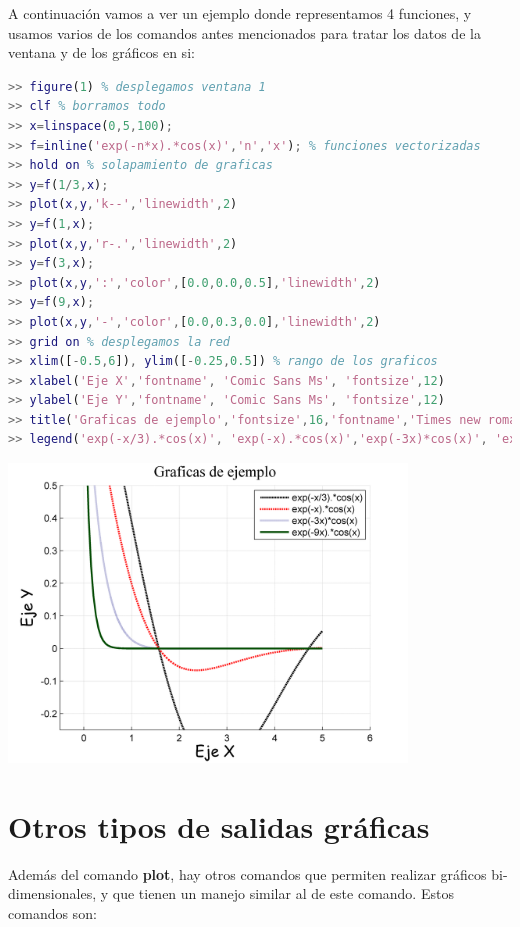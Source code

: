 A continuación vamos a ver un ejemplo donde representamos 4 funciones, y usamos varios de los comandos antes mencionados para tratar los datos de la ventana y de los gráficos en si:

\begin{lstlisting}[language=Matlab]
>> figure(1) % desplegamos ventana 1
>> clf % borramos todo
>> x=linspace(0,5,100);
>> f=inline('exp(-n*x).*cos(x)','n','x'); % funciones vectorizadas
>> hold on % solapamiento de graficas
>> y=f(1/3,x);
>> plot(x,y,'k--','linewidth',2)
>> y=f(1,x);
>> plot(x,y,'r-.','linewidth',2)
>> y=f(3,x);
>> plot(x,y,':','color',[0.0,0.0,0.5],'linewidth',2)
>> y=f(9,x);
>> plot(x,y,'-','color',[0.0,0.3,0.0],'linewidth',2)
>> grid on % desplegamos la red
>> xlim([-0.5,6]), ylim([-0.25,0.5]) % rango de los graficos
>> xlabel('Eje X','fontname', 'Comic Sans Ms', 'fontsize',12)
>> ylabel('Eje Y','fontname', 'Comic Sans Ms', 'fontsize',12)
>> title('Graficas de ejemplo','fontsize',16,'fontname','Times new roman')
>> legend('exp(-x/3).*cos(x)', 'exp(-x).*cos(x)','exp(-3x)*cos(x)', 'exp(-9x).*cos(x)');
\end{lstlisting}
\begin{center}
\includegraphics[width=300pt]{./Imagenes/plotas.png}
\end{center}





\section{Otros tipos de salidas gráficas}

Además del comando \textbf{plot}, hay otros comandos que permiten realizar gráficos bi-dimensionales, y que tienen un manejo similar al de este comando. Estos comandos son:

